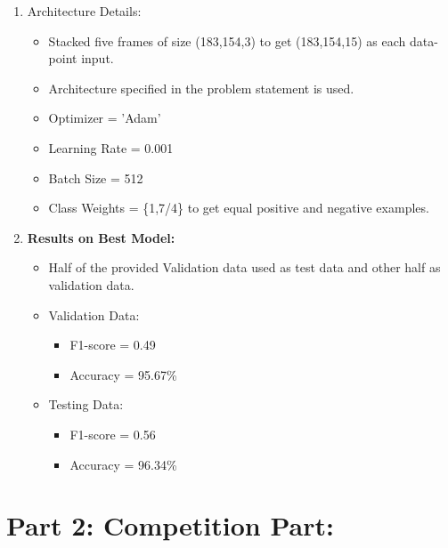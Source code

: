 \documentclass[a4 paper]{article}
\begin{document}
\begin{enumerate}
    \item Architecture Details:
    \begin{itemize}
        \item Stacked five frames of size (183,154,3) to get (183,154,15) as each data-point input.
        \item Architecture specified in the problem statement is used.
        \item Optimizer = 'Adam'
        \item Learning Rate = 0.001
        \item Batch Size = 512
        \item Class Weights = \{1,7/4\} to get equal positive and negative examples.
    \end{itemize}

    \item \textbf{Results on Best Model:}
    \begin{itemize}
        \item Half of the provided Validation data used as test data and other half as validation data.
        \item Validation Data:
            \begin{itemize}
                \item F1-score = 0.49
                \item Accuracy = 95.67\%
            \end{itemize}
        \item Testing Data:
            \begin{itemize}
                \item F1-score = 0.56
                \item Accuracy = 96.34\%
            \end{itemize}
    \end{itemize}

\end{enumerate}

\section*{Part 2: Competition Part:}
\end{document}

